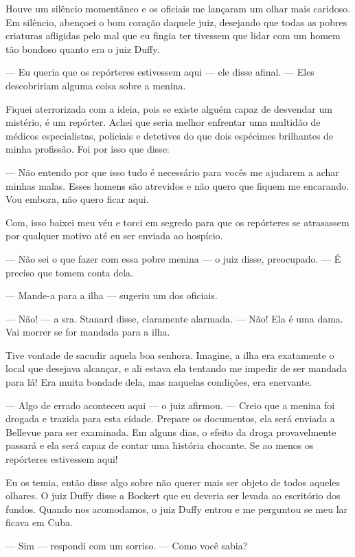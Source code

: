 Houve um silêncio momentâneo e os oficiais me lançaram um olhar mais
caridoso. Em silêncio, abençoei o bom coração daquele juiz, desejando
que todas as pobres criaturas afligidas pelo mal que eu fingia ter
tivessem que lidar com um homem tão bondoso quanto era o juiz Duffy.

--- Eu queria que os repórteres estivessem aqui --- ele disse afinal.
--- Eles descobririam alguma coisa sobre a menina.

Fiquei aterrorizada com a ideia, pois se existe alguém capaz de
desvendar um mistério, é um repórter. Achei que seria melhor enfrentar
uma multidão de médicos especialistas, policiais e detetives do que dois
espécimes brilhantes de minha profissão. Foi por isso que disse:

--- Não entendo por que isso tudo é necessário para vocês me ajudarem a
achar minhas malas. Esses homens são atrevidos e não quero que fiquem me
encarando. Vou embora, não quero ficar aqui.

Com, isso baixei meu véu e torci em segredo para que os repórteres se
atrasassem por qualquer motivo até eu ser enviada ao hospício.

--- Não sei o que fazer com essa pobre menina --- o juiz disse,
preocupado. --- É preciso que tomem conta dela.

--- Mande-a para a ilha --- sugeriu um dos oficiais.

--- Não! --- a sra. Stanard disse, claramente alarmada. --- Não! Ela é
uma dama. Vai morrer se for mandada para a ilha.

Tive vontade de sacudir aquela boa senhora. Imagine, a ilha era
exatamente o local que desejava alcançar, e ali estava ela tentando me
impedir de ser mandada para lá! Era muita bondade dela, mas naquelas
condições, era enervante.

--- Algo de errado aconteceu aqui --- o juiz afirmou. --- Creio que a
menina foi drogada e trazida para esta cidade. Prepare os documentos,
ela será enviada a Bellevue para ser examinada. Em alguns dias, o efeito
da droga provavelmente passará e ela será capaz de contar uma história
chocante. Se ao menos os repórteres estivessem aqui!

Eu os temia, então disse algo sobre não querer mais ser objeto de todos
aqueles olhares. O juiz Duffy disse a Bockert que eu deveria ser levada
ao escritório dos fundos. Quando nos acomodamos, o juiz Duffy entrou e
me perguntou se meu lar ficava em Cuba.

--- Sim --- respondi com um sorriso. --- Como você sabia?

